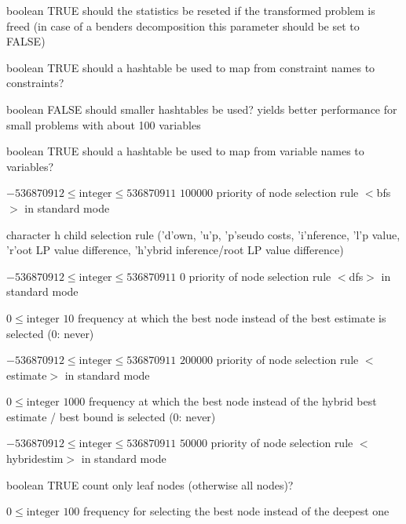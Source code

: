 %
{boolean}%
{TRUE}%
{should the statistics be reseted if the transformed problem is freed (in case of a benders decomposition this parameter should be set to FALSE)}%
{}

%
{boolean}%
{TRUE}%
{should a hashtable be used to map from constraint names to constraints?}%
{}

%
{boolean}%
{FALSE}%
{should smaller hashtables be used? yields better performance for small problems with about 100 variables}%
{}

%
{boolean}%
{TRUE}%
{should a hashtable be used to map from variable names to variables?}%
{}

%
{$-536870912\leq\textrm{integer}\leq536870911$}%
{$100000$}%
{priority of node selection rule $<$bfs$>$ in standard mode}%
{}

%
{character}%
{h}%
{child selection rule ('d'own, 'u'p, 'p'seudo costs, 'i'nference, 'l'p value, 'r'oot LP value difference, 'h'ybrid inference/root LP value difference)}%
{}

%
{$-536870912\leq\textrm{integer}\leq536870911$}%
{$0$}%
{priority of node selection rule $<$dfs$>$ in standard mode}%
{}

%
{$0\leq\textrm{integer}$}%
{$10$}%
{frequency at which the best node instead of the best estimate is selected (0: never)}%
{}

%
{$-536870912\leq\textrm{integer}\leq536870911$}%
{$200000$}%
{priority of node selection rule $<$estimate$>$ in standard mode}%
{}

%
{$0\leq\textrm{integer}$}%
{$1000$}%
{frequency at which the best node instead of the hybrid best estimate / best bound is selected (0: never)}%
{}

%
{$-536870912\leq\textrm{integer}\leq536870911$}%
{$50000$}%
{priority of node selection rule $<$hybridestim$>$ in standard mode}%
{}

%
{boolean}%
{TRUE}%
{count only leaf nodes (otherwise all nodes)?}%
{}

%
{$0\leq\textrm{integer}$}%
{$100$}%
{frequency for selecting the best node instead of the deepest one}%
{}

